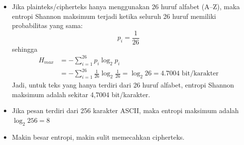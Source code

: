 \documentclass{article}
\begin{document}

\begin{itemize}
    \item Jika plainteks/cipherteks hanya menggunakan 26 huruf alfabet (A--Z), maka entropi Shannon maksimum terjadi ketika seluruh 26 huruf memiliki probabilitas yang sama:
    \[ p_i = \frac{1}{26} \]
    sehingga
    \begin{align*}
    H_{max} &= - \sum_{i=1}^{26} p_i \log_2 p_i \\
    &= - \sum_{i=1}^{26} \frac{1}{26} \log_2 \frac{1}{26} = \log_2 26 = 4.7004 \text{ bit/karakter}
    \end{align*}
    Jadi, untuk teks yang hanya terdiri dari 26 huruf alfabet, entropi Shannon maksimum adalah sekitar 4,7004 bit/karakter.
    
    \item Jika pesan terdiri dari 256 karakter ASCII, maka entropi maksimum adalah $\log_2 256 = 8$
    
    \item Makin besar entropi, makin sulit memecahkan cipherteks.
\end{itemize}
\end{document}
